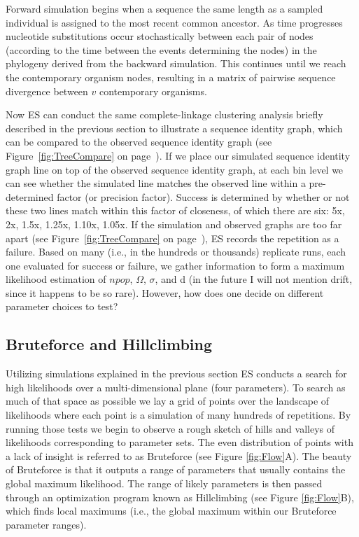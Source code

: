 Forward simulation begins when a sequence the same length as a sampled individual is assigned to the most recent common ancestor.
As time progresses nucleotide substitutions occur stochastically between each pair of nodes (according to the time between the events determining the nodes) in the phylogeny derived from the backward simulation. 
This continues until we reach the contemporary organism nodes, resulting in a matrix of pairwise sequence divergence between $v$ contemporary organisms.

Now ES can conduct the same complete-linkage clustering analysis briefly described in the previous section to illustrate a sequence identity graph, which can be compared to the observed sequence identity graph (see Figure~\ref{fig:TreeCompare} on page~\pageref{fig:TreeCompare}).
If we place our simulated sequence identity graph line on top of the observed sequence identity graph, at each bin level we can see whether the simulated line matches the observed line within a pre-determined factor (or precision factor).
Success is determined by whether or not these two lines match within this factor of closeness, of which there are six: 5x, 2x, 1.5x, 1.25x, 1.10x, 1.05x.
If the simulation and observed graphs are too far apart (see Figure~\ref{fig:TreeCompare} on page~\pageref{fig:TreeCompare}), ES records the repetition as a failure.
Based on many (i.e., in the hundreds or thousands) replicate runs, each one evaluated for success or failure, we gather information to form a maximum likelihood estimation of $npop$, $\Omega$, $\sigma$, and d (in the future I will not mention drift, since it happens to be so rare). However, how does one decide on different parameter choices to test?

\subsection*{Bruteforce and Hillclimbing}
Utilizing simulations explained in the previous section ES conducts a search for high likelihoods over a multi-dimensional plane (four parameters).
To search as much of that space as possible we lay a grid of points over the landscape of likelihoods where each point is a simulation of many hundreds of repetitions.
By running those tests we begin to observe a rough sketch of hills and valleys of likelihoods corresponding to parameter sets.
The even distribution of points with a lack of insight is referred to as Bruteforce (see Figure \ref{fig:Flow}A).
The beauty of Bruteforce is that it outputs a range of parameters that usually contains the global maximum likelihood.
The range of likely parameters is then passed through an optimization program known as Hillclimbing (see Figure \ref{fig:Flow}B), which finds local maximums (i.e., the global maximum within our Bruteforce parameter ranges).

